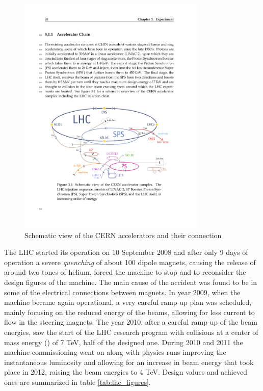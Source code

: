 \begin{figure}
\begin{center}
\includegraphics[angle=-0,width=0.8\textwidth]{2_LHC_and_CMS/pics/LHC.pdf}
\caption{Schematic view of the CERN accelerators and their connection
\label{fig:cern_accelerators}
}
\end{center}
\end{figure}

The LHC started its operation on 10 September 2008 and after only 9 days of operation a severe \emph{quenching} of about 100 dipole magnets, causing the release of around two tones of helium, forced the machine to stop and to reconsider the design figures of the machine. The main cause of the accident was found to be in some of the electrical connections between magnets. In year 2009, when the machine became again operational, a very careful ramp-up plan was scheduled, mainly focusing on the reduced energy of the beams, allowing for less current to flow in the steering magnets. The year 2010, after a careful ramp-up of the beam energies, saw the start of the LHC research program with collisions at a center of mass energy (\sqrts) of 7 TeV, half of the designed one. During 2010 and 2011 the machine commissioning went on along with physics runs improving the instantaneous luminosity and allowing for an increase in beam energy that took place in 2012, raising the beam energies to 4 TeV. Design values and achieved ones are summarized in table \ref{tab:lhc_figures}.

